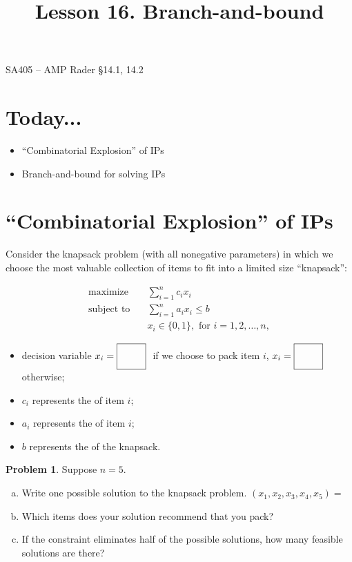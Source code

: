 \documentclass[11pt]{article}
\makeatletter
\renewcommand{\labelitemi}{$\bullet$}
\theoremstyle{definition}
\newtheorem{problem}{Problem}
\newcommand{\answerbox}[3]{%
  \fbox{%
    \begin{minipage}[#1]{#2}
      \hfill\vspace{#3}
    \end{minipage}
  }
}
\newcommand{\answerboxone}[2]{%
  \answerbox{#1}{6.0in}{#2} 
}
\newcommand{\wordbox}{\answerbox{c}{1.2in}{.7cm}}
\newcommand{\letterbox}{\answerbox{c}{.7cm}{.7cm}}
\newcommand{\maximize}{\text{maximize}}
\newcommand{\subjectto}{\text{subject to}}
\renewcommand{\maketitle}{
  \noindent SA405 -- AMP \hfill Rader \S 14.1, 14.2  \\

  \begin{center}\Large{\textbf{\@title}}\end{center}
}
\makeatother
\begin{document}
  
\title{Lesson 16.  Branch-and-bound}

\maketitle

\section{Today...}
\begin{itemize}
\item ``Combinatorial Explosion'' of IPs
\item Branch-and-bound for solving IPs
\end{itemize}

\section{``Combinatorial Explosion'' of IPs}

Consider the knapsack problem (with all nonegative parameters) in which we choose the most valuable collection of items to fit into a limited size ``knapsack'':

    \begin{align*}
      \maximize \quad & \sum_{i=1}^n c_i x_i \\
      \subjectto \quad & \sum_{i=1}^n a_i x_i \leq b \\
                       & x_i \in \{0,1\}, \text{ for } i = 1, 2,\dots,n,
    \end{align*}
\begin{itemize}
\item decision variable $x_i = \letterbox~$ if we choose to pack item $i$, $x_i = \letterbox$ otherwise;
\item $c_i$ represents the \wordbox of item $i$;
\item $a_i$ represents the \wordbox of item $i$;
\item $b$ represents the \wordbox of the knapsack.
\end{itemize}

\bigskip
\begin{problem}
Suppose $n = 5$.  
\begin{enumerate}[(a)]
\item Write one possible solution to the knapsack problem. $(x_1, x_2, x_3, x_4, x_5) =$ \wordbox
\item Which items does your solution recommend that you pack?  

\answerboxone{c}{1cm}

\item If the constraint eliminates half of the possible solutions, how many feasible solutions are there?  

\answerboxone{c}{1cm}
\end{enumerate}
\end{problem}
\end{document}
